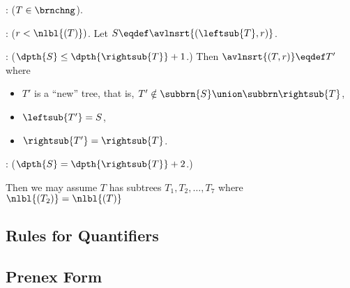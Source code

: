\begin{definition}
\begin{definition}
: ($T \in \brnchng$).  

\iffalse Let $L \eqdef \leftsub{(T)}, R \eqdef \rightsub{(T)}, d_L
\eqdef \dpth{L}, d_R \eqdef \dpth{R}.$ \fi

: ($r < \nlbl{(T)})$.  Let $S \eqdef
\avlnsrt{(\leftsub{T}, r)}$.

: ($\dpth{S} \leq \dpth{\rightsub{T}}+1$.)
Then $\avlnsrt{(T,r)} \eqdef T'$ where
\begin{itemize}

\item $T'$ is a ``new'' tree, that is, $T' \notin \subbrn{S} \union
  \subbrn \rightsub{T}$,

\item $\leftsub{T'} = S$,

\item $\rightsub{T'} = \rightsub{T}$.

\end{itemize}

: ($\dpth{S} = \dpth{\rightsub{T}}+2$.)

Then we may assume $T$ has subtrees $T_1,T_2,\dots,T_7$ where
$\nlbl{(T_2)} = \nlbl{(T)}$


\end{definition}

\begin{problems}
\practiceproblems
{}

\classproblems
{}

\homeworkproblems
{}

\examproblems
{}
\end{problems}

\begin{editingnotes}

\section{Rules for Quantifiers}

\subsection{Prenex Form}
\begin{problems}
\end{problems}
\end{editingnotes}


\end{definition}
